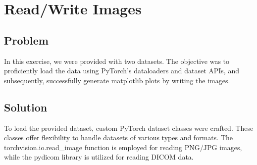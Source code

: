 \section{Read/Write Images}
\label{sec:warmup1}
    \subsection{Problem}
        In this exercise, we were provided with two datasets. The objective was to proficiently load the data using PyTorch's dataloaders and dataset APIs, and subsequently, successfully generate matplotlib plots by writing the images.
    \subsection{Solution}
        
    To load the provided dataset, custom PyTorch dataset classes were crafted. These classes offer flexibility to handle datasets of various types and formats. The torchvision.io.read\_image function is employed for reading PNG/JPG images, while the pydicom library is utilized for reading DICOM data.
    

